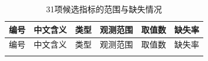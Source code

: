 \documentclass{sufethesismas}
\begin{document}
{
\footnotesize
\begin{longtable}[]{@{}
  >{\raggedright\arraybackslash}p{}
  >{\raggedright\arraybackslash}p{}
  >{\raggedright\arraybackslash}p{}
  >{\raggedright\arraybackslash}p{}
  >{\raggedright\arraybackslash}p{}
  >{\raggedright\arraybackslash}p{}@{}}
\caption{31项候选指标的范围与缺失情况}\tabularnewline
\toprule\noalign{}
\begin{minipage}[b]{\linewidth}\raggedright
编号
\end{minipage} & \begin{minipage}[b]{\linewidth}\raggedright
中文含义
\end{minipage} & \begin{minipage}[b]{\linewidth}\raggedright
类型
\end{minipage} & \begin{minipage}[b]{\linewidth}\raggedright
观测范围
\end{minipage} & \begin{minipage}[b]{\linewidth}\raggedright
取值数
\end{minipage} & \begin{minipage}[b]{\linewidth}\raggedright
缺失率
\end{minipage} \\
\midrule\noalign{}
\endfirsthead
\toprule\noalign{}
\begin{minipage}[b]{\linewidth}\raggedright
编号
\end{minipage} & \begin{minipage}[b]{\linewidth}\raggedright
中文含义
\end{minipage} & \begin{minipage}[b]{\linewidth}\raggedright
类型
\end{minipage} & \begin{minipage}[b]{\linewidth}\raggedright
观测范围
\end{minipage} & \begin{minipage}[b]{\linewidth}\raggedright
取值数
\end{minipage} & \begin{minipage}[b]{\linewidth}\raggedright
缺失率
\end{minipage} \\
\midrule\noalign{}
\endhead
\bottomrule\noalign{}
\endlastfoot

\end{longtable}}
\end{document}
